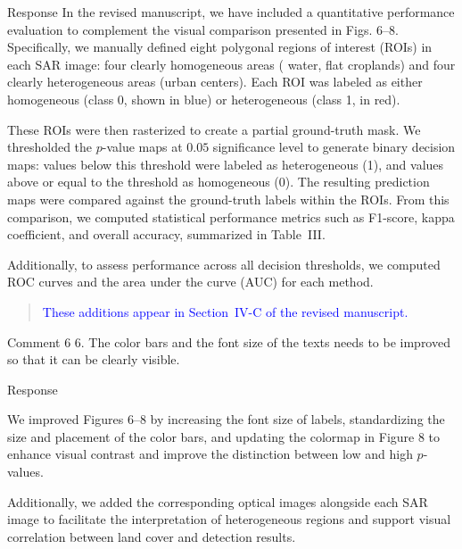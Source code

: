 \documentclass[11pt]{report}
\begin{document}
\begin{responsebox}{Response}
In the revised manuscript, we have included a quantitative performance evaluation to complement the visual comparison presented in Figs. 6–8. 
Specifically, we manually defined eight polygonal regions of interest (ROIs) in each SAR image: four clearly homogeneous areas ( water, flat croplands) and four clearly heterogeneous areas (urban centers). Each ROI was labeled as either homogeneous (class 0, shown in blue) or heterogeneous (class 1, in red).

These ROIs were then rasterized to create a partial ground-truth mask. 
We thresholded the $p$-value maps at $0.05$ significance level to generate binary decision maps: values below this threshold were labeled as heterogeneous (1), and values above or equal to the threshold as homogeneous (0). 
The resulting prediction maps were compared against the ground-truth labels within the ROIs. 
From this comparison, we computed statistical performance metrics such as F1-score, kappa coefficient, and overall accuracy, summarized in Table~III.

Additionally, to assess performance across all decision thresholds, we computed ROC curves and the area under the curve (AUC) for each method.

\begin{quote}
\textcolor{blue}{These additions appear in Section~IV-C of the revised manuscript.
}
\end{quote}
\end{responsebox}


\vspace{9em}
\begin{reviewbox}{Comment 6}
6. The color bars and the font size of the texts needs to be improved so that it can be clearly visible.
\end{reviewbox}
\begin{responsebox}{Response}


We improved Figures 6–8 by increasing the font size of labels, standardizing the size and placement of the color bars, and updating the colormap in Figure 8 to enhance visual contrast and improve the distinction between low and high $p$-values.

Additionally, we added the corresponding optical images alongside each SAR image to facilitate the interpretation of heterogeneous regions and support visual correlation between land cover and detection results.

\end{responsebox}
\end{document}
